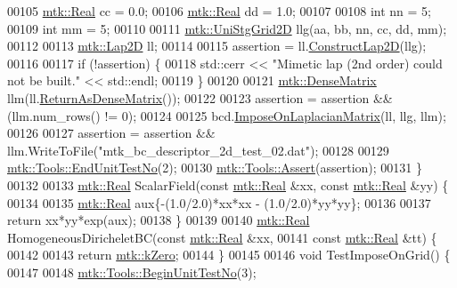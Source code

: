 \begin{DoxyCode}
00105   \hyperlink{group__c01-roots_gac080bbbf5cbb5502c9f00405f894857d}{mtk::Real} cc = 0.0;
00106   \hyperlink{group__c01-roots_gac080bbbf5cbb5502c9f00405f894857d}{mtk::Real} dd = 1.0;
00107 
00108   \textcolor{keywordtype}{int} nn = 5;
00109   \textcolor{keywordtype}{int} mm = 5;
00110 
00111   \hyperlink{classmtk_1_1UniStgGrid2D}{mtk::UniStgGrid2D} llg(aa, bb, nn, cc, dd, mm);
00112 
00113   \hyperlink{classmtk_1_1Lap2D}{mtk::Lap2D} ll;
00114 
00115   assertion = ll.\hyperlink{classmtk_1_1Lap2D_a188ee8fee643463affca7de2884711b1}{ConstructLap2D}(llg);
00116 
00117   \textcolor{keywordflow}{if} (!assertion) \{
00118     std::cerr << \textcolor{stringliteral}{"Mimetic lap (2nd order) could not be built."} << std::endl;
00119   \}
00120 
00121   \hyperlink{classmtk_1_1DenseMatrix}{mtk::DenseMatrix} llm(ll.\hyperlink{classmtk_1_1Lap2D_aaac0a22eaa2f036869b24fd420ce5761}{ReturnAsDenseMatrix}());
00122 
00123   assertion = assertion && (llm.num\_rows() != 0);
00124 
00125   bcd.\hyperlink{classmtk_1_1RobinBCDescriptor2D_a0a26693f5265fcad978e7ba84e01ed69}{ImposeOnLaplacianMatrix}(ll, llg, llm);
00126 
00127   assertion = assertion && llm.WriteToFile(\textcolor{stringliteral}{"mtk\_bc\_descriptor\_2d\_test\_02.dat"});
00128 
00129   \hyperlink{classmtk_1_1Tools_aba67d9dc35c9c1c49430fcc9ea035e03}{mtk::Tools::EndUnitTestNo}(2);
00130   \hyperlink{classmtk_1_1Tools_ac6804df469c94ab6a796fb64f1e44a89}{mtk::Tools::Assert}(assertion);
00131 \}
00132 
00133 \hyperlink{group__c01-roots_gac080bbbf5cbb5502c9f00405f894857d}{mtk::Real} ScalarField(\textcolor{keyword}{const} \hyperlink{group__c01-roots_gac080bbbf5cbb5502c9f00405f894857d}{mtk::Real} &xx, \textcolor{keyword}{const} \hyperlink{group__c01-roots_gac080bbbf5cbb5502c9f00405f894857d}{mtk::Real} &yy) \{
00134 
00135   \hyperlink{group__c01-roots_gac080bbbf5cbb5502c9f00405f894857d}{mtk::Real} aux\{-(1.0/2.0)*xx*xx - (1.0/2.0)*yy*yy\};
00136 
00137   \textcolor{keywordflow}{return} xx*yy*exp(aux);
00138 \}
00139 
00140 \hyperlink{group__c01-roots_gac080bbbf5cbb5502c9f00405f894857d}{mtk::Real} HomogeneousDiricheletBC(\textcolor{keyword}{const} \hyperlink{group__c01-roots_gac080bbbf5cbb5502c9f00405f894857d}{mtk::Real} &xx,
00141                                   \textcolor{keyword}{const} \hyperlink{group__c01-roots_gac080bbbf5cbb5502c9f00405f894857d}{mtk::Real} &tt) \{
00142 
00143   \textcolor{keywordflow}{return} \hyperlink{group__c01-roots_ga59a451a5fae30d59649bcda274fea271}{mtk::kZero};
00144 \}
00145 
00146 \textcolor{keywordtype}{void} TestImposeOnGrid() \{
00147 
00148   \hyperlink{classmtk_1_1Tools_afc29ecaf337a13ed2e817d3890a5a441}{mtk::Tools::BeginUnitTestNo}(3);

\end{DoxyCode}
